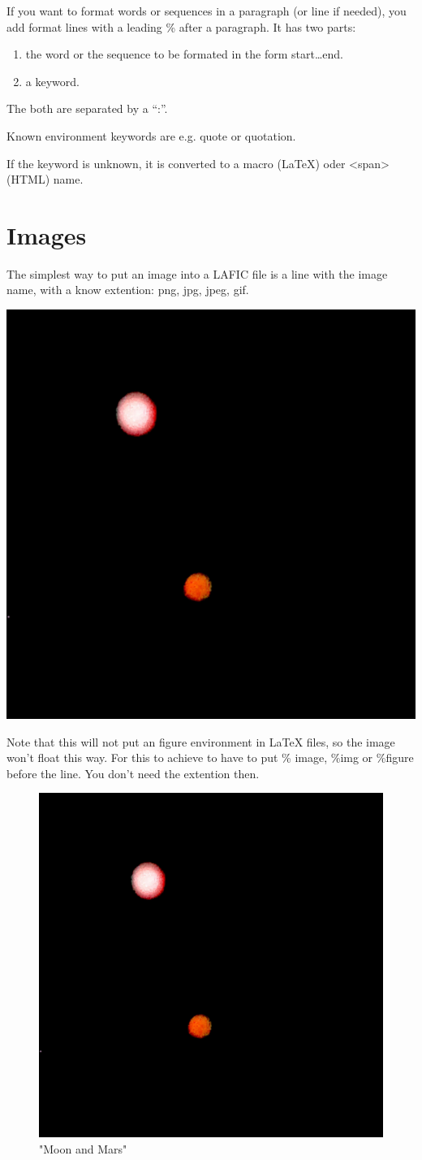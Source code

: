 \documentclass{article}
\begin{document}
If you want to format words or sequences in a paragraph (or
line if needed), you add format lines with a leading \% after
a paragraph. It has two parts:

\begin{enumerate}

\item the word or the sequence to be formated in the form
  start…end. 
\item a keyword.

\end{enumerate}

The both are separated by a "`:"'.

Known environment keywords are e.g. quote or quotation.

If the keyword is unknown, it is converted to a macro
(LaTeX) oder <span> (HTML) name.

\section{Images}

The simplest way to put an image into a LAFIC file is a
line with the image name, with a know extention: png, jpg,
jpeg, gif.

\includegraphics[height=.40\textheight]{Image.png}

Note that this will not put an figure environment in LaTeX
files, so the image won't float this way. For this to
achieve to have to put \% image, \%img or \%figure before the
line. You don't need the extention then.

\begin{figure}[hbt]
\includegraphics[width=.40\linewidth]{Image.png}
\caption{"Moon and Mars"}
\end{figure}
\end{document}
